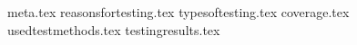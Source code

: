 {meta.tex} %
{reasonsfortesting.tex}
{typesoftesting.tex}
{coverage.tex}
{usedtestmethods.tex}
{testingresults.tex}
